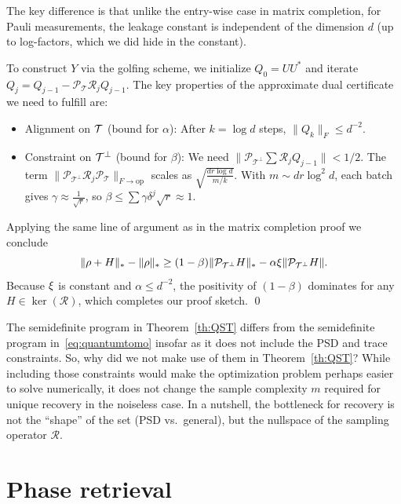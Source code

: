 The key difference is that unlike the entry-wise case in matrix completion, for Pauli measurements, the leakage constant is independent of the dimension $d$ (up to log-factors, which we did hide in the constant).

To construct $Y$ via the golfing scheme, we initialize $Q_0 = U U^{\ast}$ and iterate $Q_j = Q_{j-1} - \mathcal{P}_{\mathcal{T}} \mathcal{R}_j Q_{j-1}$. The key properties of the approximate dual certificate we need to fulfill are:
\begin{itemize}
\item Alignment on $\mathcal{T}$  (bound for $\alpha$): After $k = \log d$ steps, $\|Q_k\|_F \le d^{-2}$. 
\item Constraint on $\mathcal{T}^\perp$  (bound for $\beta$): We need $\|\mathcal{P}_{\mathcal{T}^\perp} \sum \mathcal{R}_j Q_{j-1}\| < 1/2$. The term $\|\mathcal{P}_{\mathcal{T}^\perp} \mathcal{R}_j \mathcal{P}_{\mathcal{T}}\|_{F \to \text{op}}$ scales as $\sqrt{\frac{d r \log d}{m/k}}$.
With $m \sim d r \log^2 d$, each batch gives $\gamma \approx \frac{1}{\sqrt{r}}$, so $\beta \le \sum \gamma \delta^j \sqrt{r} \approx 1$.
\end{itemize}

Applying the same line of argument as in the matrix completion proof we conclude 
$$\|\rho+H\|_* - \|\rho\|_* \ge (1 - \beta) \|\mathcal{P}_{\mathcal{T}^\perp}H\|_* - \alpha \xi \|\mathcal{P}_{\mathcal{T}^\perp}H\|.$$
Because $\xi$ is constant and $\alpha \le d^{-2}$, the positivity of $(1-\beta)$ dominates for any $H \in \ker(\mathcal{R})$, which completes our proof sketch. \qed

\medskip

\begin{remark}
The semidefinite program in Theorem~\ref{th:QST} differs from the semidefinite program in~\eqref{eq:quantumtomo} insofar as it does not include the PSD and trace constraints. So, why did we not make use of them in Theorem~\ref{th:QST}?
While including those constraints would make the optimization problem perhaps easier to solve numerically, it does not change the sample complexity $m$ required for unique recovery in the noiseless case. In a nutshell, the bottleneck for recovery is not the ``shape'' of the set (PSD vs.\ general), but the nullspace of the sampling operator ${\mathcal R}$.
\end{remark}





\section{Phase retrieval}

